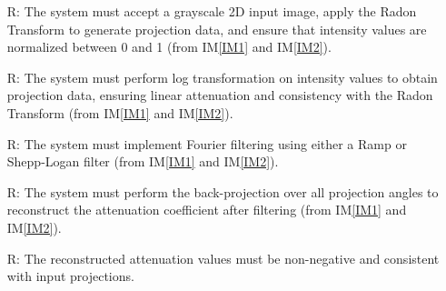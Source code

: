 \documentclass[12pt]{article}
\newcounter{reqnum} %
\begin{document}
\noindent \begin{itemize}

\item[R\refstepcounter{reqnum}\thereqnum \label{R1}:] The system must accept a
  grayscale 2D input image, apply the Radon Transform to generate projection
  data, and ensure that intensity values are normalized between 0 and 1 (from
  IM\ref{IM1} and IM\ref{IM2}).

\item[R\refstepcounter{reqnum}\thereqnum \label{R2}:] The system must perform log
  transformation on intensity values to obtain projection data, ensuring linear
  attenuation and consistency with the Radon Transform (from IM\ref{IM1} and IM\ref{IM2}).

\item[R\refstepcounter{reqnum}\thereqnum \label{R3}:] The system must implement
  Fourier filtering using either a Ramp or Shepp-Logan filter (from IM\ref{IM1} and IM\ref{IM2}).

\item[R\refstepcounter{reqnum}\thereqnum \label{R4}:] The system must perform the
  back-projection over all projection angles to reconstruct the attenuation
  coefficient after filtering (from IM\ref{IM1} and IM\ref{IM2}).

\item[R\refstepcounter{reqnum}\thereqnum \label{R5}:] The reconstructed attenuation
  values must be non-negative and consistent with input projections.
\end{itemize}
\end{document}

